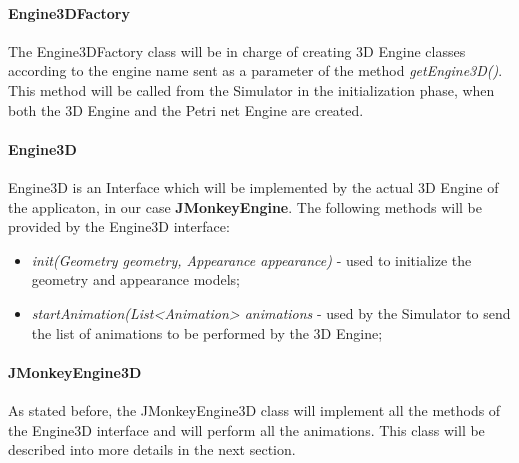 \paragraph{Engine3DFactory}

The Engine3DFactory class will be in charge of creating 3D Engine classes according to the engine name sent as a parameter of the method \textit{getEngine3D()}. This method will be called from the Simulator in the initialization phase, when both the 3D Engine and the Petri net Engine are created. 

\paragraph{Engine3D}

Engine3D is an Interface which will be implemented by the actual 3D Engine of the applicaton, in our case \textbf{JMonkeyEngine}. The following methods will be provided by the Engine3D interface: 
\begin{itemize}
\item \textit{init(Geometry geometry, Appearance appearance)} - used to initialize the geometry and appearance models;
\item \textit{startAnimation(List<Animation> animations} - used by the Simulator to send the list of animations to be performed by the 3D Engine; 
\end{itemize}

\paragraph{JMonkeyEngine3D}

As stated before, the JMonkeyEngine3D class will implement all the methods of the Engine3D interface and will perform all the animations. This class will be described into more details in the next section.